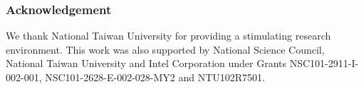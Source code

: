 \subsubsection{Acknowledgement} \label{sec:ack}

We thank National Taiwan University for providing a stimulating research environment.
This work was also supported by National Science Council, National Taiwan University and Intel Corporation under Grants NSC101-2911-I-002-001, NSC101-2628-E-002-028-MY2 and NTU102R7501.

